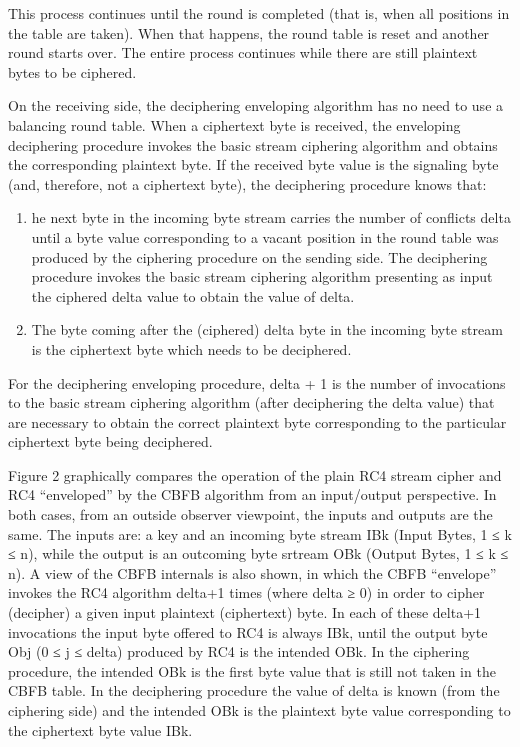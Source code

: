 \documentclass[conference]{IEEEtran}
\begin{document}
This process continues until the round is completed (that is, when all positions in the table are taken). When that happens, the round table is reset and another round starts over. The entire process continues while there are still plaintext bytes to be ciphered.

On the receiving side, the deciphering enveloping algorithm has no need to use a balancing round table. When a ciphertext byte is received, the enveloping deciphering procedure invokes the basic stream ciphering algorithm and obtains the corresponding plaintext byte. If the received byte value is the signaling byte (and, therefore, not a ciphertext byte), the deciphering procedure knows that: 

\begin{enumerate}
	\item he next byte in the incoming byte stream carries the number of conflicts delta until a byte value corresponding to a vacant position in the round table was produced by the ciphering procedure on the sending side. The deciphering procedure invokes the basic stream ciphering algorithm presenting as input the ciphered delta value to obtain the value of delta.
	\item The byte coming after the (ciphered) delta byte in the incoming byte stream is the ciphertext byte which needs to be deciphered.
\end{enumerate}

For the deciphering enveloping procedure, delta + 1 is the number of invocations to the basic stream ciphering algorithm (after deciphering the delta value)  that are necessary to obtain the correct plaintext byte corresponding to the particular ciphertext byte being deciphered. 

Figure 2 graphically compares the operation of the plain RC4 stream cipher and RC4 “enveloped” by the CBFB algorithm from an input/output perspective. In both cases, from an outside observer viewpoint, the inputs and outputs are the same. The inputs are: a key and an incoming byte stream IBk (Input Bytes, 1 ≤ k ≤ n), while the output is an outcoming byte srtream OBk (Output Bytes, 1 ≤ k ≤ n). A view of the CBFB internals is also shown, in which the CBFB “envelope” invokes the RC4 algorithm delta+1 times (where delta ≥ 0) in order to cipher (decipher) a given input plaintext (ciphertext) byte. In each of these delta+1 invocations the input byte offered to RC4 is always IBk, until the output byte Obj (0 ≤  j ≤  delta) produced by RC4 is the intended OBk. In the ciphering procedure, the intended OBk is the first byte value that is still not taken in the CBFB table. In the deciphering procedure the value of delta is known (from the ciphering side) and the intended OBk is the plaintext byte value corresponding to the ciphertext byte value IBk.
\end{document}
